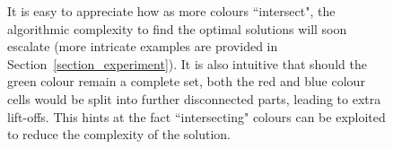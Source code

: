 \documentclass[conference]{IEEEtran}
\begin{document}
\begin{figure}[t]
{%
It is easy to appreciate how as more colours ``intersect", the algorithmic complexity to find the optimal solutions will soon escalate (more intricate examples are provided in Section~\ref{section_experiment}). 
It is also intuitive that should the green colour remain a complete set, both the red and blue colour cells would be split into further disconnected parts, leading to extra lift-offs. %
This hints at the fact ``intersecting" colours %
can be exploited to reduce the complexity of the solution.
}
\label{fig:mapping}
\end{figure}




\end{document}
